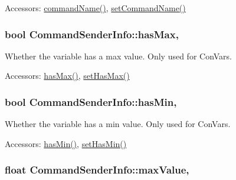 \begin{DoxyParagraph}{Accessors\-:}
\hyperlink{class_command_sender_info_af9825e2019cac0c5c9793eefe8086b6c}{command\-Name()}, \hyperlink{class_command_sender_info_a35b041f14c94c82d2fd32d1b2877bc54}{set\-Command\-Name()} 
\end{DoxyParagraph}
\hypertarget{class_command_sender_info_ae003e4ee143379be99e52bbe6dce3a69}{
\subsubsection[{has\-Max}]{\setlength{\rightskip}{0pt plus 5cm}bool Command\-Sender\-Info\-::has\-Max\hspace{0.3cm}{\ttfamily [read]}, {\ttfamily [write]}}}\label{class_command_sender_info_ae003e4ee143379be99e52bbe6dce3a69}


Whether the variable has a max value. Only used for Con\-Vars. 

\begin{DoxyParagraph}{Accessors\-:}
\hyperlink{class_command_sender_info_ae003e4ee143379be99e52bbe6dce3a69}{has\-Max()}, \hyperlink{class_command_sender_info_a69ac1e0453b2a79bc697def44a8d356e}{set\-Has\-Max()} 
\end{DoxyParagraph}
\hypertarget{class_command_sender_info_a9f34e6eb3bab0b16dff37fdacd82695e}{
\subsubsection[{has\-Min}]{\setlength{\rightskip}{0pt plus 5cm}bool Command\-Sender\-Info\-::has\-Min\hspace{0.3cm}{\ttfamily [read]}, {\ttfamily [write]}}}\label{class_command_sender_info_a9f34e6eb3bab0b16dff37fdacd82695e}


Whether the variable has a min value. Only used for Con\-Vars. 

\begin{DoxyParagraph}{Accessors\-:}
\hyperlink{class_command_sender_info_a9f34e6eb3bab0b16dff37fdacd82695e}{has\-Min()}, \hyperlink{class_command_sender_info_ac46d887956a3edbadc8375a97c85b38f}{set\-Has\-Min()} 
\end{DoxyParagraph}
\hypertarget{class_command_sender_info_ac5b816de5b4e61339e0b649bd8f58799}{
\subsubsection[{max\-Value}]{\setlength{\rightskip}{0pt plus 5cm}float Command\-Sender\-Info\-::max\-Value\hspace{0.3cm}{\ttfamily [read]}, {\ttfamily [write]}}}\label{class_command_sender_info_ac5b816de5b4e61339e0b649bd8f58799}


